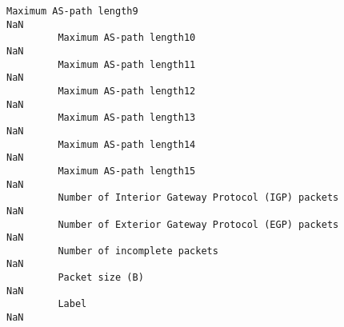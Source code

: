 \documentclass[11pt]{article}
\begin{document}
\begin{Verbatim}[commandchars=\\\{\}]
         Maximum AS-path length9                                              NaN   
         Maximum AS-path length10                                             NaN   
         Maximum AS-path length11                                             NaN   
         Maximum AS-path length12                                             NaN   
         Maximum AS-path length13                                             NaN   
         Maximum AS-path length14                                             NaN   
         Maximum AS-path length15                                             NaN   
         Number of Interior Gateway Protocol (IGP) packets                    NaN   
         Number of Exterior Gateway Protocol (EGP) packets                    NaN   
         Number of incomplete packets                                         NaN   
         Packet size (B)                                                      NaN   
         Label                                                                NaN   
         

\end{Verbatim}
\end{document}
